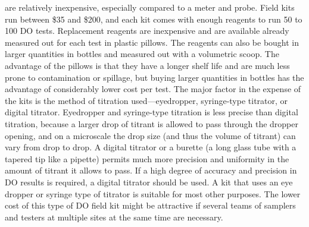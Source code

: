 \documentclass{article}
\begin{document}
are relatively inexpensive, especially compared to a meter and probe.
Field kits run between \$35 and \$200, and each kit comes with enough
reagents to run 50 to 100 DO tests. Replacement reagents are inexpensive
and are available already measured out for each test in plastic pillows.
The reagents can also be bought in larger quantities in bottles and
measured out with a volumetric scoop. The advantage of the pillows is
that they have a longer shelf life and are much less prone to
contamination or spillage, but buying larger quantities in bottles has
the advantage of considerably lower cost per test. The major factor in
the expense of the kits is the method of titration used---eyedropper,
syringe-type titrator, or digital titrator. Eyedropper and syringe-type
titration is less precise than digital titration, because a larger drop
of titrant is allowed to pass through the dropper opening, and on a
microscale the drop size (and thus the volume of titrant) can vary from
drop to drop. A digital titrator or a burette (a long glass tube with a
tapered tip like a pipette) permits much more precision and uniformity
in the amount of titrant it allows to pass. If a high degree of accuracy
and precision in DO results is required, a digital titrator should be
used. A kit that uses an eye dropper or syringe type of titrator is
suitable for most other purposes. The lower cost of this type of DO
field kit might be attractive if several teams of samplers and testers
at multiple sites at the same time are necessary.
\end{document}
